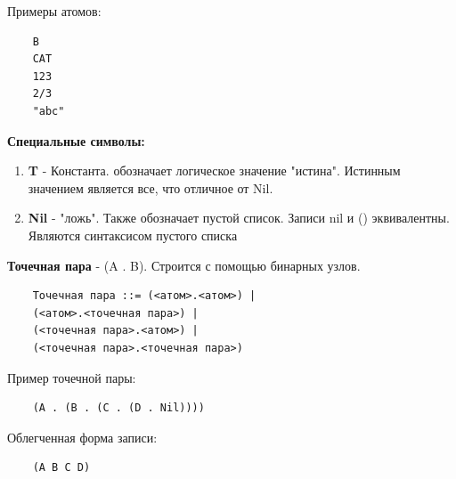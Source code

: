 Примеры атомов:
\begin{lstlisting}
	B
	CAT
	123
	2/3
	"abc"
\end{lstlisting}


\textbf{Специальные символы:}

\begin{enumerate}
	\item \textbf{T} - Константа. обозначает логическое значение "истина". Истинным значением является все, что отличное от Nil.
	\item \textbf{Nil} - "ложь". Также обозначает пустой список. Записи nil и () эквивалентны. Являются синтаксисом пустого списка
\end{enumerate}

\textbf{Точечная пара} - (A . B). Строится с помощью бинарных узлов.   

\begin{lstlisting}
	Точечная пара ::= (<атом>.<атом>) |
	(<атом>.<точечная пара>) |
	(<точечная пара>.<атом>) |
	(<точечная пара>.<точечная пара>)	
\end{lstlisting}

Пример точечной пары:
\begin{lstlisting}
	(A . (B . (C . (D . Nil))))
\end{lstlisting}
Облегченная форма записи:
\begin{lstlisting}
	(A B C D)
\end{lstlisting}

\begin{figure}[ht!]
\end{figure}



